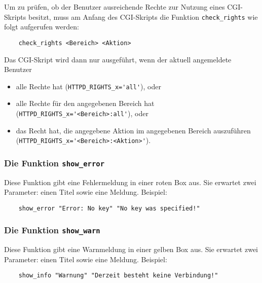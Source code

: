 Um zu prüfen, ob der Benutzer ausreichende Rechte zur Nutzung eines CGI-Skripts
besitzt, muss am Anfang des CGI-Skripts die Funktion \texttt{check\_rights}
wie folgt aufgerufen werden:

\begin{example}
\begin{verbatim}
    check_rights <Bereich> <Aktion>
\end{verbatim}
\end{example}

Das CGI-Skript wird dann nur ausgeführt, wenn der aktuell angemeldete Benutzer
\begin{itemize}
\item alle Rechte hat (\verb+HTTPD_RIGHTS_x='all'+), oder
\item alle Rechte für den angegebenen Bereich hat
    (\verb+HTTPD_RIGHTS_x='<Bereich>:all'+), oder
\item das Recht hat, die angegebene Aktion im angegebenen Bereich auszuführen\\
    (\verb+HTTPD_RIGHTS_x='<Bereich>:<Aktion>'+).
\end{itemize}


\subsubsection{Die Funktion \texttt{show\_error}}

Diese Funktion gibt eine Fehlermeldung in einer roten Box aus. Sie erwartet
zwei Parameter: einen Titel sowie eine Meldung. Beispiel:

\begin{example}
\begin{verbatim}
    show_error "Error: No key" "No key was specified!"
\end{verbatim}
\end{example}

\subsubsection{Die Funktion \texttt{show\_warn}}

Diese Funktion gibt eine Warnmeldung in einer gelben Box aus. Sie erwartet
zwei Parameter: einen Titel sowie eine Meldung. Beispiel:

\begin{example}
\begin{verbatim}
    show_info "Warnung" "Derzeit besteht keine Verbindung!"
\end{verbatim}
\end{example}

